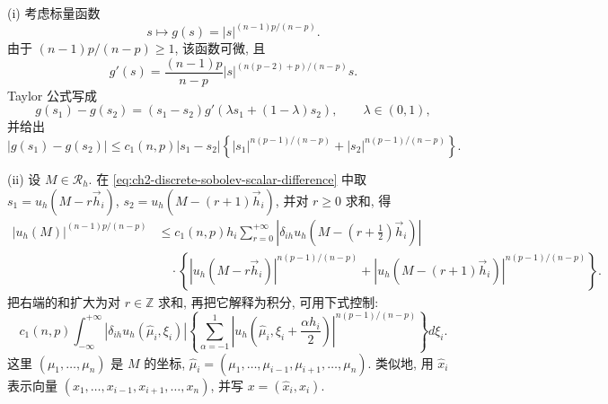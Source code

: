 \hypertarget{chapter-02-page-137}{}
\begin{Proof}
(i) 考虑标量函数
\[
s\longmapsto g(s)=|s|^{(n-1)p/(n-p)}.
\]
由于 $(n-1)p/(n-p)\geq1$, 该函数可微, 且
\[
g'(s)=\frac{(n-1)p}{n-p}|s|^{(n(p-2)+p)/(n-p)}s.
\]
Taylor 公式写成
\[
g(s_1)-g(s_2)=(s_1-s_2)g'(\lambda s_1+(1-\lambda)s_2),
\qquad\lambda\in(0,1),
\]
并给出
\begin{equation}
|g(s_1)-g(s_2)|
\leq c_1(n,p)|s_1-s_2|
\left\{|s_1|^{n(p-1)/(n-p)}+|s_2|^{n(p-1)/(n-p)}\right\}.
\label{eq:ch2-discrete-sobolev-scalar-difference}
\end{equation}

(ii) 设 $M\in\mathcal R_h$. 在 \eqref{eq:ch2-discrete-sobolev-scalar-difference} 中取 $s_1=u_h(M-r\vec h_i)$, $s_2=u_h(M-(r+1)\vec h_i)$, 并对 $r\geq0$ 求和, 得
\begin{equation}
\begin{aligned}
|u_h(M)|^{(n-1)p/(n-p)}
&\leq c_1(n,p)h_i\sum_{r=0}^{+\infty}
\left|\delta_{ih}u_h\left(M-\left(r+\frac12\right)\vec h_i\right)\right|\\
&\quad\cdot\left\{|u_h(M-r\vec h_i)|^{n(p-1)/(n-p)}
+|u_h(M-(r+1)\vec h_i)|^{n(p-1)/(n-p)}\right\}.
\end{aligned}
\label{eq:ch2-discrete-sobolev-telescoping}
\end{equation}
把右端的和扩大为对 $r\in\mathbb Z$ 求和, 再把它解释为积分, 可用下式控制:
\[
c_1(n,p)\int_{-\infty}^{+\infty}
|\delta_{ih}u_h(\widehat\mu_i,\xi_i)|
\left\{\sum_{\alpha=-1}^{1}
\left|u_h\left(\widehat\mu_i,\xi_i+\frac{\alpha h_i}{2}\right)\right|^{n(p-1)/(n-p)}\right\}d\xi_i.
\]
这里 $(\mu_1,\ldots,\mu_n)$ 是 $M$ 的坐标, $\widehat\mu_i=(\mu_1,\ldots,\mu_{i-1},\mu_{i+1},\ldots,\mu_n)$. 类似地, 用 $\widehat x_i$ 表示向量 $(x_1,\ldots,x_{i-1},x_{i+1},\ldots,x_n)$, 并写 $x=(\widehat x_i,x_i)$.


\end{Proof}
